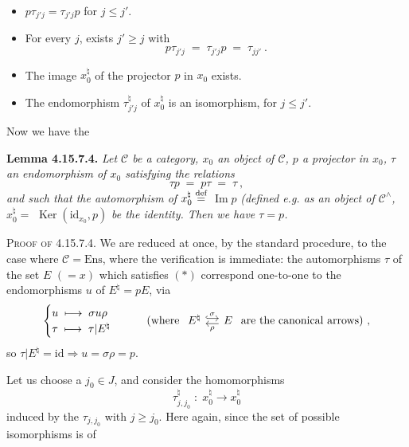 \documentclass[11pt]{article}
\newcommand{\printedpage}[1]{\marginpar{\footnotesize p.~#1}}
\newcommand{\msp}[1]{\marginpar{\footnotesize [#1]}}
\newcommand{\cC}{\mathcal{C}}
\newcommand{\id}{\mathrm{id}}
\newcommand{\Img}{\operatorname{Im}}
\newcommand{\Ker}{\operatorname{Ker}}
\newcommand{\defeq}{\overset{\text{\upshape def}}{=}}
\begin{document}
\begin{itemize}
\item[1°)] $p\tau_{j'j} = \tau_{j'j}p$ for $j \leqslant j'$.
\item[2°)] For every $j$, exists $j' \geqslant j$ with
\[
p\tau_{j'j} \;=\; \tau_{j'j}p \;=\; \tau_{jj'}\ . %
\]
\item[3°)] The image $x_0^\natural$ of the projector $p$ in $x_0$ exists.
\item[4°)] The endomorphism $\tau^\natural_{j'j}$ of $x_0^\natural$ is an isomorphism, for $j \leqslant j'$.
\end{itemize}
\msp{page 445}
Now we have the

\textbf{Lemma 4.15.7.4.} \textit{Let $\cC$ be a category, $x_0$ an object of $\cC$, $p$ a projector in $x_0$, $\tau$ an endomorphism of $x_0$ satisfying the relations}
\[
\tau p \;=\; p\tau \;=\; \tau\ , \tag*{$(*)$}
\]
\printedpage{171}
\textit{and such that the automorphism of $x_0^\natural \defeq$} $\Img p$ \textit{(defined e.g. as an object of $\cC^\wedge$, $x_0^\natural =$} $\Ker(\id_{x_0},p)$ %
\textit{be the identity. Then we have $\tau = p$.}

\textsc{Proof of} 4.15.7.4. We are reduced at once, by the standard procedure, to the case where $\cC = \mathrm{Ens}$, where the verification is immediate: the automorphisms $\tau$ of the set $E$ $(= x)$ which satisfies $(*)$ correspond one-to-one to the endomorphisms $u$ of $E^\natural = pE$, via
\[
\begin{cases}
u \;\longmapsto\; \sigma u \rho \\
\tau \;\longmapsto\; \tau|E^\natural
\end{cases}
\qquad
\text{(where }
\begin{tikzcd}[column sep=small]
E^\natural \arrow[r, hook, shift left, "\sigma"] & E \arrow[l, shift left, "\rho"]
\end{tikzcd}
\text{ are the canonical arrows)}\ ,
\]
so $\tau|E^\natural = \id \Longrightarrow u = \sigma\rho = p$.

Let us choose a $j_0 \in J$, and consider the homomorphisms
\[
\tau^\natural_{j,j_0} \;:\; x_0^\natural \longrightarrow x_0^\natural
\]
induced by the $\tau_{j,j_0}$ with $j \geqslant j_0$. Here again, since the set of possible isomorphisms is of
\end{document}
